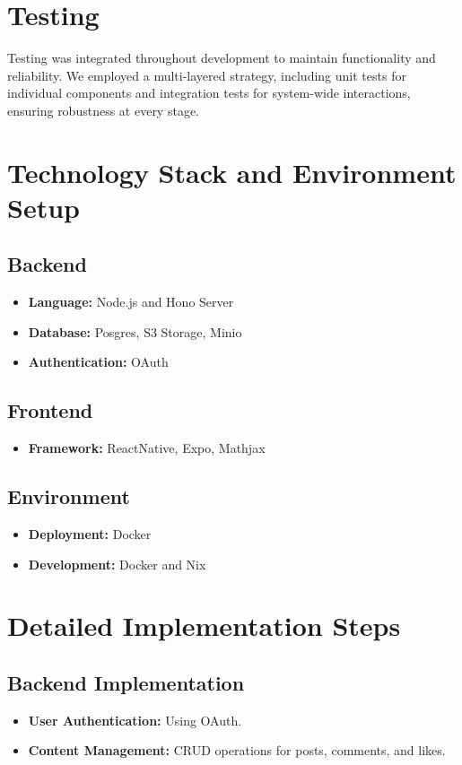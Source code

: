 \section{Testing}
\label{sec:testing}

Testing was integrated throughout development to maintain functionality and reliability. We employed a multi-layered strategy, including unit tests for individual components and integration tests for system-wide interactions, ensuring robustness at every stage.

\section{Technology Stack and Environment Setup}
\subsection{Backend}
\begin{itemize}
    \item \textbf{Language:} Node.js and Hono Server
    \item \textbf{Database:} Posgres, S3 Storage, Minio
    \item \textbf{Authentication:} OAuth
\end{itemize}

\subsection{Frontend}
\begin{itemize}
    \item \textbf{Framework:} ReactNative, Expo, Mathjax
\end{itemize}

\subsection{Environment}
\begin{itemize}
    \item \textbf{Deployment:} Docker
    \item \textbf{Development:} Docker and Nix
\end{itemize}

\section{Detailed Implementation Steps}
\subsection{Backend Implementation}
\begin{itemize}
    \item \textbf{User Authentication:} Using OAuth.
    \item \textbf{Content Management:} CRUD operations for posts, comments, and likes.
\end{itemize}


